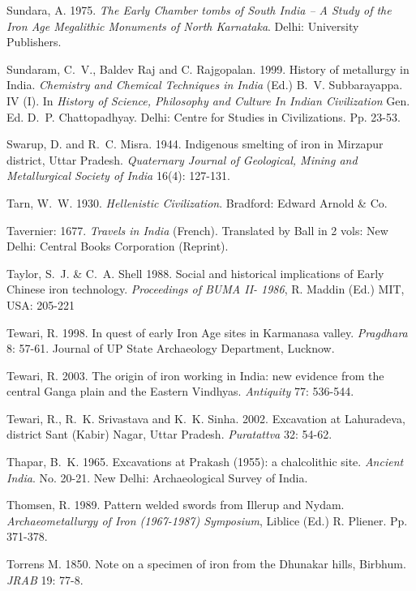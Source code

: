 \begin{thebibliography}{99}
 Sundara, A. 1975. \textit{The Early Chamber tombs of South India – A Study of the Iron Age Megalithic Monuments of North Karnataka}. Delhi: University Publishers. 

 Sundaram, C.~V., Baldev Raj and C. Rajgopalan. 1999. History of metallurgy in India. \textit{Chemistry and Chemical Techniques in India} (Ed.) B.~V. Subbarayappa. IV (I). In \textit{History of Science, Philosophy and Culture In Indian Civilization} Gen. Ed. D.~P. Chattopadhyay. Delhi: Centre for Studies in Civilizations. Pp. 23-53.

 Swarup, D. and R.~C. Misra. 1944. Indigenous smelting of iron in Mirzapur district, Uttar Pradesh. \textit{Quaternary Journal of Geological, Mining and Metallurgical Society of India} 16(4): 127-131. 

 Tarn, W.~W. 1930. \textit{Hellenistic Civilization}. Bradford: Edward Arnold \& Co.

 Tavernier: 1677. \textit{Travels in India} (French). Translated by Ball in 2 vols: New Delhi: Central Books Corporation (Reprint). 

 Taylor, S.~J. \& C.~A. Shell 1988.  Social and historical implications of Early Chinese iron technology. \textit{Proceedings of BUMA II- 1986}, R. Maddin (Ed.) MIT, USA: 205-221

 Tewari, R. 1998. In quest of early Iron Age sites in Karmanasa valley. \textit{Pragdhara} 8: 57-61. Journal of UP State Archaeology Department, Lucknow. 

 Tewari, R. 2003. The origin of iron working in India: new evidence from the central Ganga plain and the Eastern Vindhyas. \textit{Antiquity} 77: 536-544.

 Tewari, R., R.~K. Srivastava and K.~K. Sinha. 2002. Excavation at Lahuradeva, district Sant (Kabir) Nagar, Uttar Pradesh. \textit{Puratattva} 32: 54-62.

 Thapar, B.~K. 1965. Excavations at Prakash (1955): a chalcolithic site. \textit{Ancient India}. No. 20-21. New Delhi: Archaeological Survey of India. 

 Thomsen, R. 1989. Pattern welded swords from Illerup and Nydam. \textit{Archaeometallurgy of Iron (1967-1987) Symposium}, Liblice (Ed.) R. Pliener. Pp. 371-378.

 Torrens M. 1850. Note on a specimen of iron from the Dhunakar hills, Birbhum. \textit{JRAB} 19: 77-8.


\end{thebibliography}
